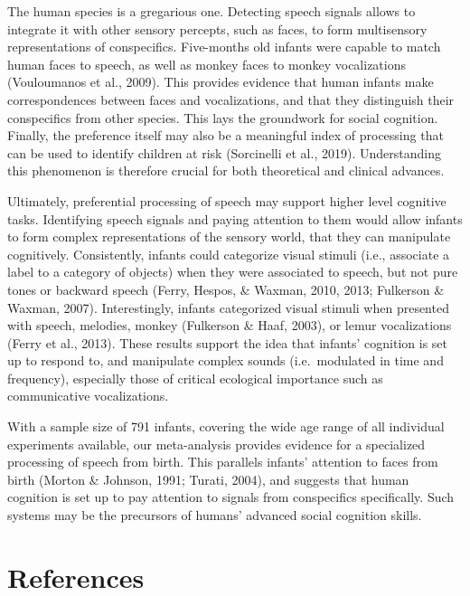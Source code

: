 \documentclass[
  man,mask,floatsintext]{apa6}
\begin{document}
The human species is a gregarious one. Detecting speech signals allows to integrate it with other sensory percepts, such as faces, to form multisensory representations of conspecifics. Five-months old infants were capable to match human faces to speech, as well as monkey faces to monkey vocalizations (Vouloumanos et al., 2009). This provides evidence that human infants make correspondences between faces and vocalizations, and that they distinguish their conspecifics from other species. This lays the groundwork for social cognition. Finally, the preference itself may also be a meaningful index of processing that can be used to identify children at risk (Sorcinelli et al., 2019). Understanding this phenomenon is therefore crucial for both theoretical and clinical advances.

Ultimately, preferential processing of speech may support higher level cognitive tasks. Identifying speech signals and paying attention to them would allow infants to form complex representations of the sensory world, that they can manipulate cognitively. Consistently, infants could categorize visual stimuli (i.e., associate a label to a category of objects) when they were associated to speech, but not pure tones or backward speech (Ferry, Hespos, \& Waxman, 2010, 2013; Fulkerson \& Waxman, 2007). Interestingly, infants categorized visual stimuli when presented with speech, melodies, monkey (Fulkerson \& Haaf, 2003), or lemur vocalizations (Ferry et al., 2013). These results support the idea that infants' cognition is set up to respond to, and manipulate complex sounds (i.e.~modulated in time and frequency), especially those of critical ecological importance such as communicative vocalizations.

With a sample size of 791 infants, covering the wide age range of all individual experiments available, our meta-analysis provides evidence for a specialized processing of speech from birth. This parallels infants' attention to faces from birth (Morton \& Johnson, 1991; Turati, 2004), and suggests that human cognition is set up to pay attention to signals from conspecifics specifically. Such systems may be the precursors of humans' advanced social cognition skills.

\newpage

\hypertarget{references}{%
\section{References}\label{references}}
\end{document}
